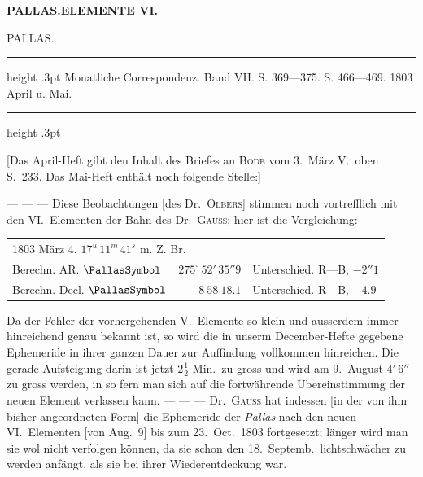 \newcommand{\JunoSymbol}{\text{\mdseries\AstroSymbols ⚵}}
\clearpage
\begingroup
\pagestyle{empty}
\thispagestyle{empty}
\noindent{}%
%
\parbox[t]{\dimexpr\linewidth-24mm\relax}{\centering\footnotesize\bfseries PALLAS.\quad ELEMENTE VI.\par}%
\makebox[12mm][r]{}\par\nobreak\medskip
\begin{center}\large PALLAS.\end{center}
\begin{center}\parbox{.92\linewidth}{\centering\footnotesize\frenchspacing
\hrule height .3pt\relax\vspace{2.5pt}
Monatliche Correspondenz. Band VII. S. 369—375. S. 466—469. 1803 April u. Mai.\par
\vspace{2.5pt}\hrule height .3pt\relax
}\end{center}


[Das April-Heft gibt den Inhalt des Briefes an \textsc{Bode} vom 3.\ März V.\ oben S.\ 233. Das Mai-Heft enthält noch folgende Stelle:]

— — — Diese Beobachtungen [des Dr.\ \textsc{Olbers}] stimmen noch vortrefflich mit den VI.\ Elementen der Bahn des Dr.\ \textsc{Gauss}; hier ist die Vergleichung:

\begin{center}
\begingroup\fontsize{10}{12}\selectfont\setlength{\tabcolsep}{3pt}\renewcommand{\arraystretch}{1.12}
\begin{tabular}{lrl}
\multicolumn{3}{l}{1803 März 4. $17^u\,11^m\,41^s$ m. Z. Br.} \\
Berechn. AR. $\PallasSymbol$ & $275^\circ\,52'\,35''9$ & Unterschied. R—B, $-2''1$ \\
Berechn. Decl. $\PallasSymbol$ & $8\ 58\ 18.1$ & Unterschied. R—B, $-4.9$ \\
\end{tabular}\endgroup
\end{center}

Da der Fehler der vorhergehenden V.\ Elemente so klein und ausserdem immer hinreichend genau bekannt ist, so wird die in unserm December-Hefte gegebene Ephemeride in ihrer ganzen Dauer zur Auffindung vollkommen hinreichen. Die gerade Aufsteigung darin ist jetzt $2\tfrac{1}{2}$ Min.\ zu gross und wird am 9.\ August $4'\,6''$ zu gross werden, in so fern man sich auf die fortwährende Übereinstimmung der neuen Element verlassen kann. — — — Dr.\ \textsc{Gauss} hat indessen [in der von ihm bisher angeordneten Form] die Ephemeride der \emph{Pallas} nach den neuen VI.\ Elementen [von Aug.\ 9] bis zum 23.\ Oct.\ 1803 fortgesetzt; länger wird man sie wol nicht verfolgen können, da sie schon den 18.\ Septemb.\ lichtschwächer zu werden anfängt, als sie bei ihrer Wiederentdeckung war.

